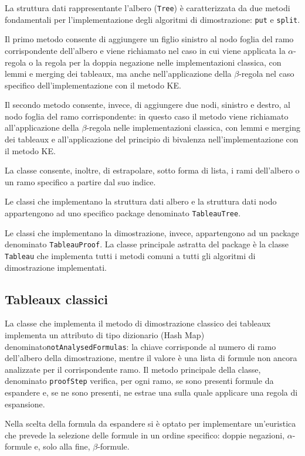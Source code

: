 \documentclass[12pt,a4paper]{article}
\theoremstyle{plain}
\theoremstyle{definition}
\theoremstyle{remark}
\begin{document}
La struttura dati rappresentante l'albero (\texttt{Tree}) è caratterizzata da due metodi fondamentali per l'implementazione degli algoritmi
di dimostrazione: \texttt{put} e \texttt{split}.

Il primo metodo consente di aggiungere un figlio sinistro al nodo foglia del ramo corrispondente dell'albero e viene richiamato
nel caso in cui viene applicata la $\alpha$-regola o la regola per la doppia negazione nelle implementazioni classica, con lemmi
e merging dei tableaux, ma anche nell'applicazione della $\beta$-regola nel caso specifico dell'implementazione con il metodo KE.

Il secondo metodo consente, invece, di aggiungere due nodi, sinistro e destro, al nodo foglia del ramo corrispondente: in questo
caso il metodo viene richiamato all'applicazione della $\beta$-regola nelle implementazioni classica, con lemmi e merging dei tableaux
e all'applicazione del principio di bivalenza nell'implementazione con il metodo KE.

La classe consente, inoltre, di estrapolare, sotto forma di lista, i rami dell'albero o un ramo specifico a partire dal suo indice.

Le classi che implementano la struttura dati albero e la struttura dati nodo appartengono ad uno specifico package denominato
\texttt{TableauTree}.

Le classi che implementano la dimostrazione, invece, appartengono ad un package denominato \texttt{TableauProof}. La classe principale
astratta del package è la classe \texttt{Tableau} che implementa tutti i metodi comuni a tutti gli algoritmi di dimostrazione
implementati.

\subsection*{Tableaux classici}
La classe che implementa il metodo di dimostrazione classico dei tableaux implementa un attributo di tipo dizionario (Hash Map)
denominato\linebreak\texttt{notAnalysedFormulas}: la chiave corrisponde al numero di ramo dell'albero della dimostrazione, mentre il valore
è una lista di formule non ancora analizzate per il corrispondente ramo. Il metodo principale della classe, denominato
\texttt{proofStep} verifica, per ogni ramo, se sono presenti formule da espandere e, se ne sono presenti, ne estrae una sulla
quale applicare una regola di espansione.

Nella scelta della formula da espandere si è optato per implementare un'euristica che prevede la selezione delle formule in
un ordine specifico: doppie negazioni, $\alpha$-formule e, solo alla fine, $\beta$-formule.
\end{document}
